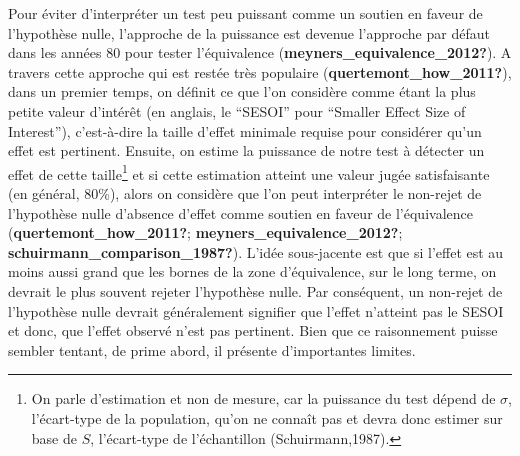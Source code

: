 \documentclass[
  english,
  man]{apa6}
\begin{document}
Pour éviter d'interpréter un test peu puissant comme un soutien en faveur de l'hypothèse nulle, l'approche de la puissance est devenue l'approche par défaut dans les années 80 pour tester l'équivalence (\textbf{meyners\_equivalence\_2012?}). A travers cette approche qui est restée très populaire (\textbf{quertemont\_how\_2011?}), dans un premier temps, on définit ce que l'on considère comme étant la plus petite valeur d'intérêt (en anglais, le ``SESOI'' pour ``Smaller Effect Size of Interest''), c'est-à-dire la taille d'effet minimale requise pour considérer qu'un effet est pertinent. Ensuite, on estime la puissance de notre test à détecter un effet de cette taille\footnote{On parle d'estimation et non de mesure, car la puissance du test dépend de $\sigma$, l'écart-type de la population, qu'on ne connaît pas et devra donc estimer sur base de $S$, l'écart-type de l'échantillon (Schuirmann,1987).} et si cette estimation atteint une valeur jugée satisfaisante (en général, 80\%), alors on considère que l'on peut interpréter le non-rejet de l'hypothèse nulle d'absence d'effet comme soutien en faveur de l'équivalence (\textbf{quertemont\_how\_2011?}; \textbf{meyners\_equivalence\_2012?}; \textbf{schuirmann\_comparison\_1987?}). L'idée sous-jacente est que si l'effet est au moins aussi grand que les bornes de la zone d'équivalence, sur le long terme, on devrait le plus souvent rejeter l'hypothèse nulle. Par conséquent, un non-rejet de l'hypothèse nulle devrait généralement signifier que l'effet n'atteint pas le SESOI et donc, que l'effet observé n'est pas pertinent. Bien que ce raisonnement puisse sembler tentant, de prime abord, il présente d'importantes limites.
\end{document}
